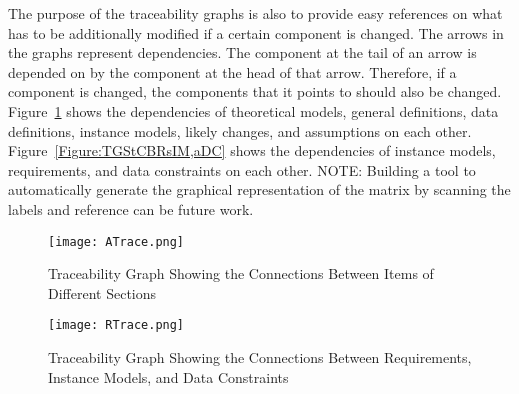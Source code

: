 \documentclass[12pt]{article}
\begin{document}
The purpose of the traceability graphs is also to provide easy references on what has to be additionally modified if a certain component is changed. The arrows in the graphs represent dependencies. The component at the tail of an arrow is depended on by the component at the head of that arrow. Therefore, if a component is changed, the components that it points to should also be changed. Figure~\ref{Figure:TGStCBIoDS} shows the dependencies of theoretical models, general definitions, data definitions, instance models, likely changes, and assumptions on each other. Figure~\ref{Figure:TGStCBRsIM,aDC} shows the dependencies of instance models, requirements, and data constraints on each other.
NOTE: Building a tool to automatically generate the graphical representation of the matrix by scanning the labels and reference can be future work.
\begin{figure}
\begin{center}
\texttt{[image: ATrace.png]}
\caption{Traceability Graph Showing the Connections Between Items of Different Sections}
\label{Figure:TGStCBIoDS}
\end{center}
\end{figure}
\begin{figure}
\begin{center}
\texttt{[image: RTrace.png]}
\caption{Traceability Graph Showing the Connections Between Requirements, Instance Models, and Data Constraints}
\label{Figure:TGStCBRsIMsaDC}
\end{center}
\end{figure}
\end{document}
